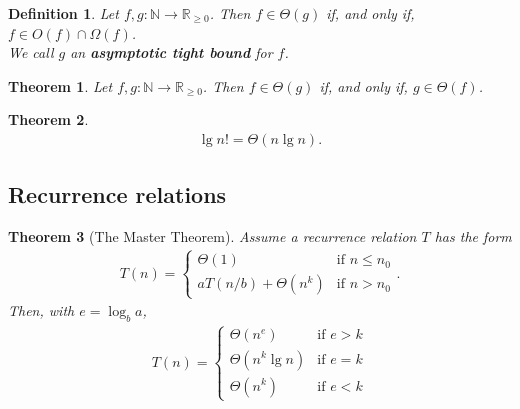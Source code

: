 \documentclass{article}
\theoremstyle{sltheorem}
\newtheorem{definition}{Definition}[section]
\newtheorem{theorem}{Theorem}[section]
\newcommand{\R}{\mathbb{R}}
\newcommand{\N}{\mathbb{N}}
\newcommand*\B[1]{\textbf{#1}}
\begin{document}
\begin{definition}
	Let $f,g:\N\to\R_{\geq 0}$. Then $f\in\Theta(g)$ if, and only if, $f\in O(f) \cap \Omega(f)$.\\
	We call $g$ an \B{asymptotic tight bound} for $f$.
\end{definition}
\begin{theorem}
	Let $f,g:\N\to\R_{\geq 0}$. Then $f\in\Theta(g)$ if, and only if, $g\in\Theta(f)$.
\end{theorem}
\begin{theorem}
	\begin{align*}
		\lg n! = \Theta(n \lg n).
	\end{align*}
\end{theorem}
\subsection{Recurrence relations}
\begin{theorem}[The Master Theorem]
	Assume a recurrence relation $T$ has the form
	\begin{align*}
		T(n) = \begin{cases}
			\Theta(1) &\text{if $n\leq n_0$}\\
			aT(n/b) + \Theta(n^k) &\text{if $n>n_0$}
		\end{cases}.
	\end{align*}
	Then, with $e=\log_b a$, 
	\begin{align*}
		T(n) = \begin{cases}
			\Theta(n^e) &\text{if $e>k$}\\
			\Theta(n^k\lg n) &\text{if $e=k$}\\
			\Theta(n^k) &\text{if $e<k$}
		\end{cases}
	\end{align*}
\end{theorem}
\end{document}
